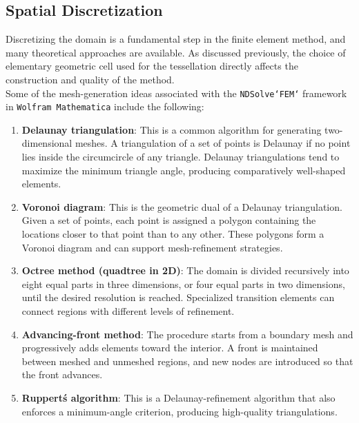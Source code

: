 \documentclass[a4paper]{article}
\begin{document}
\subsection{Spatial Discretization}
Discretizing the domain is a fundamental step in the finite element method, and many theoretical approaches are available. As discussed previously, the choice of elementary geometric cell used for the tessellation directly affects the construction and quality of the method.\\

Some of the mesh-generation ideas associated with the \texttt{NDSolve`FEM`} framework in \texttt{Wolfram Mathematica} include the following:
\begin{enumerate}
  \item \textbf{Delaunay triangulation}: This is a common algorithm for generating two-dimensional meshes. A triangulation of a set of points is Delaunay if no point lies inside the circumcircle of any triangle. Delaunay triangulations tend to maximize the minimum triangle angle, producing comparatively well-shaped elements.
  \item \textbf{Voronoi diagram}: This is the geometric dual of a Delaunay triangulation. Given a set of points, each point is assigned a polygon containing the locations closer to that point than to any other. These polygons form a Voronoi diagram and can support mesh-refinement strategies.
  \item \textbf{Octree method (quadtree in 2D)}: The domain is divided recursively into eight equal parts in three dimensions, or four equal parts in two dimensions, until the desired resolution is reached. Specialized transition elements can connect regions with different levels of refinement.
  \item \textbf{Advancing-front method}: The procedure starts from a boundary mesh and progressively adds elements toward the interior. A front is maintained between meshed and unmeshed regions, and new nodes are introduced so that the front advances.
  \item \textbf{Ruppert\'s algorithm}: This is a Delaunay-refinement algorithm that also enforces a minimum-angle criterion, producing high-quality triangulations.
  

\end{enumerate}
\end{document}
